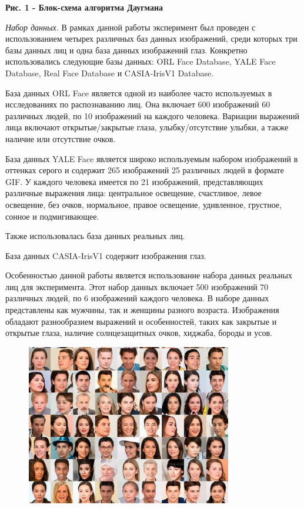 {\bfseries Рис. 1 - Блок-схема алгоритма Даугмана}

\emph{Набор данных.} В рамках данной работы эксперимент был проведен с
использованием четырех различных баз данных изображений, среди которых
три базы данных лиц и одна база данных изображений глаз. Конкретно
использовались следующие базы данных: ORL Face Database, YALE Face
Database, Real Face Database и CASIA-IrisV1 Database.

База данных ORL Face является одной из наиболее часто используемых в
исследованиях по распознаванию лиц. Она включает 600 изображений 60
различных людей, по 10 изображений на каждого человека. Вариации
выражений лица включают открытые/закрытые глаза, улыбку/отсутствие
улыбки, а также наличие или отсутствие очков.

База данных YALE Face является широко используемым набором изображений в
оттенках серого и содержит 265 изображений 25 различных людей в формате
GIF. У каждого человека имеется по 21 изображений, представляющих
различные выражения лица: центральное освещение, счастливое, левое
освещение, без очков, нормальное, правое освещение, удивленное,
грустное, сонное и подмигивающее.

Также использовалась база данных реальных лиц.

База данных CASIA-IrisV1 содержит изображения глаз.

Особенностью данной работы является использование набора данных реальных
лиц для эксперимента. Этот набор данных включает 500 изображений 70
различных людей, по 6 изображений каждого человека. В наборе данных
представлены как мужчины, так и женщины разного возраста. Изображения
обладают разнообразием выражений и особенностей, таких как закрытые и
открытые глаза, наличие солнцезащитных очков, хиджаба, бороды и усов.

\begin{figure}[H]
	\centering
	\includegraphics[width=0.8\textwidth]{assets/84}
	\caption*{}
\end{figure}

